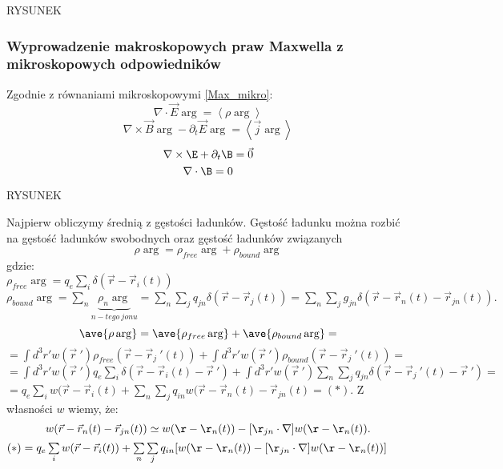 RYSUNEK
\subsubsection{Wyprowadzenie makroskopowych praw Maxwella z 
mikroskopowych odpowiedników}
Zgodnie z równaniami mikroskopowymi \ref{Max_mikro}:
\begin{equation} 
	\nabla \cdot \vec{E}\arg=\left< \rho \arg \right> \label{startr1}
\end{equation}
\begin{equation} 
	\nabla \times \vec{B}\arg-\partial_t\vec{E}\arg=\left< \vec{j}\arg
	\right> \label{startr2}
\end{equation}
\begin{equation} 
	\nabla \times \E+\partial_t \B=\vec{0} \label{startr3}
\end{equation}
\begin{equation} 
	\nabla \cdot \B=0 \label{startr4}
\end{equation}
\begin{center} RYSUNEK \end{center}
Najpierw obliczymy średnią z gęstości ładunków.
Gęstość ładunku można rozbić na gęstość ładunków swobodnych oraz 
gęstość ładunków związanych
$$\rho \arg = \rho_{free} \arg + \rho_{bound} \arg$$
gdzie:\\
$\rho_{free} \arg = q_e \sum\limits_i \delta (\vec{r}-\vec{r}_i(t))$\\
$\rho_{bound} \arg = \sum\limits_n \underbrace{\rho_n\arg}_{n-tego\
jonu}  = \sum\limits_n \sum\limits_j q_{jn} \delta (\vec{r}-\vec{r}_j(t)) 
= \sum\limits_{n} \sum\limits_{j} g_{jn}\delta(\vec{r}-\vec{r}_n(t)-
\vec{r}_{jn}(t)).$\\
$$\ave{ \rho \arg } = \ave{\rho_{free}\arg} + \ave{\rho_{bound}\arg} = $$
$=\int d^3r' w(\vec{r}\ ') \rho_{free}(\vec{r}-\vec{r}_j\ '(t))+
\int d^3r' w(\vec{r}\ ') \rho_{bound}(\vec{r}-\vec{r}_j\ '(t))=$\\
$ = \int d^3r' w(\vec{r}\ ')q_e \sum\limits_{i}\delta (\vec{r}-\vec{r}_i(t)
-\vec{r}\ ') + \int d^3r' w(\vec{r}\ ') \sum\limits_n \sum\limits_j q_{jn}
\delta (\vec{r}-\vec{r}_j\ '(t) - \vec{r}\ ')= $\\
$ = q_e \sum\limits_i w(\vec{r} - \vec{r}_i(t)+ \sum\limits_n \sum\limits_j q_{in} 
w(\vec{r}-\vec{r}_n(t)-\vec{r}_{jn}(t)=(*) .$
Z własności $w$ wiemy, że:
$$w(\vec{r}-\vec{r}_n(t)-\vec{r}_{jn}(t))\simeq w(\r-\r_n(t))-
[\r_{jn}\cdot\nabla]w(\r-\r_n(t)).$$
$(*)=  q_e \sum\limits_i w(\vec{r} - \vec{r}_i(t))+ \sum\limits_n 
\sum\limits_j q_{in} 
[w(\r-\r_n(t))-[\r_{jn}\cdot\nabla]w(\r-\r_n(t))]$\\
